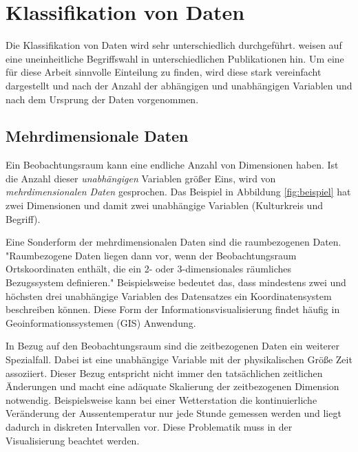 \documentclass[a4paper, 12pt, DIV=calc, version=first, pdftex, headsepline, footsepline, bibtotocnumbered, liststotocnumbered]{scrreprt}
\begin{document}
\section{Klassifikation von Daten}
\label{sec:KlassifikationDaten}

Die Klassifikation von Daten wird sehr unterschiedlich durchgeführt.
\citep{Schumann} weisen auf eine uneinheitliche Begriffswahl in unterschiedlichen
Publikationen hin.
Um eine für diese Arbeit sinnvolle Einteilung zu finden, wird diese stark vereinfacht dargestellt und nach der Anzahl der abhängigen und
unabhängigen Variablen und nach dem Ursprung der Daten vorgenommen.

\subsection{Mehrdimensionale Daten}
Ein Beobachtungsraum kann eine endliche Anzahl von Dimensionen haben. Ist die Anzahl
dieser \textit{unabhängigen} Variablen größer Eins, wird von \textit{mehrdimensionalen Daten} gesprochen. Das Beispiel
in Abbildung \ref{fig:beispiel} hat zwei Dimensionen und damit zwei unabhängige
Variablen (Kulturkreis und Begriff).

Eine Sonderform der mehrdimensionalen Daten sind die raumbezogenen Daten.
"Raumbezogene Daten liegen dann vor, wenn der Beobachtungsraum Ortskoordinaten enthält,
die ein 2- oder 3-dimensionales räumliches Bezugssystem definieren."\citep[S.\,220]{Schumann}
Beispielsweise bedeutet das, dass mindestens zwei und höchsten drei unabhängige Variablen des Datensatzes
ein Koordinatensystem beschreiben können. Diese Form der Informationsvisualisierung findet häufig
in Geoinformationssystemen (GIS) Anwendung.

In Bezug auf den Beobachtungsraum sind die zeitbezogenen Daten ein weiterer Spezialfall.
Dabei ist eine unabhängige Variable mit der physikalischen Größe Zeit assoziiert.
Dieser Bezug entspricht nicht immer den tatsächlichen zeitlichen Änderungen und macht
eine adäquate Skalierung der zeitbezogenen Dimension notwendig.
Beispielsweise kann bei einer Wetterstation die kontinuierliche Veränderung der Aussentemperatur
nur jede Stunde gemessen werden und liegt dadurch in diskreten Intervallen vor.
Diese Problematik muss in der Visualisierung beachtet werden.
\end{document}
